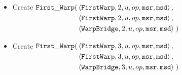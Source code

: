 \begin{itemize}
\begin{itemize}
                \item Create
                $\begin{aligned}[t]
                    \firstwarp(& \left\langle {\tt FirstWarp},  2, u, \inc, {\tt msr}, {\tt msd} \right\rangle, \\ %
                               & \left\langle {\tt FirstWarp},  2, u, \inc, {\tt msr}, {\tt msd} \right\rangle, \\ %
                               & \left\langle {\tt WarpBridge}, 2, u, \inc, {\tt msr}, {\tt msd} \right\rangle \;) %
                \end{aligned}$
                \vspace{.5cm}

                \item Create
                $\begin{aligned}[t]
                    \firstwarp(& \left\langle {\tt FirstWarp},  3, u, \inc, {\tt msr}, {\tt msd} \right\rangle,\\  %
                               & \left\langle {\tt FirstWarp},  3, u, \inc, {\tt msr}, {\tt msd} \right\rangle,\\  %
                               & \left\langle {\tt WarpBridge}, 3, u, \inc, {\tt msr}, {\tt msd} \right\rangle \;) %
                \end{aligned}$
                \vspace{.5cm}

            \end{itemize}
            \vspace{.5cm}


\end{itemize}
